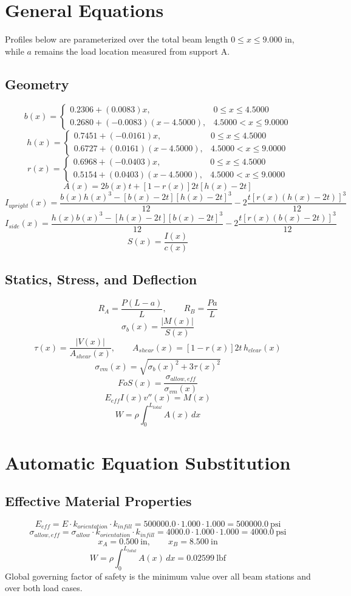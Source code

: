 \documentclass[11pt]{article}
\begin{document}
\section*{General Equations}
Profiles below are parameterized over the total beam length $0 \le x \le 9.000$ in, while $a$ remains the load location measured from support A.
\subsection*{Geometry}
\[
b(x)=\begin{cases}0.2306 + (0.0083)x, & 0 \le x \le 4.5000\\0.2680 + (-0.0083)(x-4.5000), & 4.5000 < x \le 9.0000\end{cases}
\]
\[
h(x)=\begin{cases}0.7451 + (-0.0161)x, & 0 \le x \le 4.5000\\0.6727 + (0.0161)(x-4.5000), & 4.5000 < x \le 9.0000\end{cases}
\]
\[
r(x)=\begin{cases}0.6968 + (-0.0403)x, & 0 \le x \le 4.5000\\0.5154 + (0.0403)(x-4.5000), & 4.5000 < x \le 9.0000\end{cases}
\]
\[
A(x)=2b(x)t+[1-r(x)]2t[h(x)-2t]
\]
\[
I_{upright}(x)=\frac{b(x)h(x)^3-[b(x)-2t][h(x)-2t]^3}{12}-2\frac{t[r(x)(h(x)-2t)]^3}{12}
\]
\[
I_{side}(x)=\frac{h(x)b(x)^3-[h(x)-2t][b(x)-2t]^3}{12}-2\frac{t[r(x)(b(x)-2t)]^3}{12}
\]
\[
S(x)=\frac{I(x)}{c(x)}
\]

\subsection*{Statics, Stress, and Deflection}
\[
R_A=\frac{P(L-a)}{L}, \qquad R_B=\frac{Pa}{L}
\]
\[
\sigma_b(x)=\frac{|M(x)|}{S(x)}
\]
\[
\tau(x)=\frac{|V(x)|}{A_{shear}(x)}, \qquad A_{shear}(x)=[1-r(x)]2t\,h_{clear}(x)
\]
\[
\sigma_{vm}(x)=\sqrt{\sigma_b(x)^2+3\tau(x)^2}
\]
\[
FoS(x)=\frac{\sigma_{allow,eff}}{\sigma_{vm}(x)}
\]
\[
E_{eff}I(x)v''(x)=M(x)
\]
\[
W=\rho\int_0^{L_{total}} A(x)\,dx
\]

\section*{Automatic Equation Substitution}
\subsection*{Effective Material Properties}
\[E_{eff} = E \cdot k_{orientation} \cdot k_{infill} = 500000.0 \cdot 1.000 \cdot 1.000 = 500000.0\ \mathrm{psi}\]
\[\sigma_{allow,eff} = \sigma_{allow} \cdot k_{orientation} \cdot k_{infill} = 4000.0 \cdot 1.000 \cdot 1.000 = 4000.0\ \mathrm{psi}\]
\[x_A = 0.500\ \mathrm{in}, \qquad x_B = 8.500\ \mathrm{in}\]
\[W = \rho \int_0^{L_{total}} A(x)\,dx = 0.02599\ \mathrm{lbf}\]
Global governing factor of safety is the minimum value over all beam stations and over both load cases.
\end{document}
